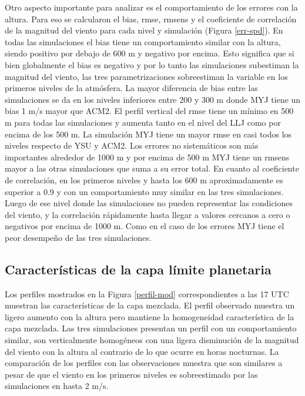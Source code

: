 \documentclass[12pt,spanish,oneside, a4paper]{book}
\begin{document}
Otro aspecto importante para analizar es el comportamiento de los
errores con la altura. Para eso se calcularon el bias, rmse, rmsens y el
coeficiente de correlación de la magnitud del viento para cada nivel y
simulación (Figura \ref{err-spd}). En todas las simulaciones el bias
tiene un comportamiento similar con la altura, siendo positivo por
debajo de 600 m y negativo por encima. Esto significa que si bien
globalmente el bias es negativo y por lo tanto las simulaciones
subestiman la magnitud del viento, las tres parametrizaciones
sobreestiman la variable en los primeros niveles de la atmósfera. La
mayor diferencia de bias entre las simulaciones se da en los niveles
inferiores entre 200 y 300 m donde MYJ tiene un bias 1 m/s mayor que
ACM2. El perfil vertical del rmse tiene un mínimo en 500 m para todas
las simulaciones y aumenta tanto en el nivel del LLJ como por encima de
los 500 m. La simulación MYJ tiene un mayor rmse en casi todos los
niveles respecto de YSU y ACM2. Los errores no sistemáticos son más
importantes alrededor de 1000 m y por encima de 500 m MYJ tiene un
rmsens mayor a las otras simulaciones que suma a su error total. En
cuanto al coeficiente de correlación, en los primeros niveles y hasta
los 600 m aproximadamente es superior a 0.9 y con un comportamiento muy
similar en las tres simulaciones. Luego de ese nivel donde las
simulaciones no pueden representar las condiciones del viento, y la
correlación rápidamente hasta llegar a valores cercanos a cero o
negativos por encima de 1000 m. Como en el caso de los errores MYJ tiene
el peor desempeño de las tres simulaciones.

\subsection{Características de la capa límite
planetaria}\label{caracteristicas-de-la-capa-limite-planetaria-1}

Los perfiles mostrados en la Figura \ref{perfil-mod} correspondientes a
las 17 UTC muestran las características de la capa mezclada. El perfil
observado muestra un ligero aumento con la altura pero mantiene la
homogeneidad característica de la capa mezclada. Las tres simulaciones
presentan un perfil con un comportamiento similar, son verticalmente
homogéneos con una ligera disminución de la magnitud del viento con la
altura al contrario de lo que ocurre en horas nocturnas. La comparación
de los perfiles con las observaciones muestra que son similares a pesar
de que el viento en los primeros niveles es sobreestimado por las
simulaciones en hasta 2 m/s.
\end{document}
